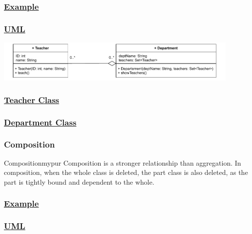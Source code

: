 \subsubsection*{\underline{Example}}

\subsubsection*{\underline{UML}}

\begin{center}
\includegraphics[width=0.9\textwidth]{Chapters/Diagram/OOP/EX5/ex5.drawio.pdf}
\end{center}


\subsubsection*{\underline{Teacher Class}}


\subsubsection*{\underline{Department Class}}


\subsubsection*{Composition}

\begin{prettyBox}{Composition}{mypur}
Composition is a stronger relationship than aggregation. In composition, when the whole class is deleted, the part class is also deleted, as the part is tightly bound and dependent to the whole.
\end{prettyBox}

\subsubsection*{\underline{Example}}

\subsubsection*{\underline{UML}}

